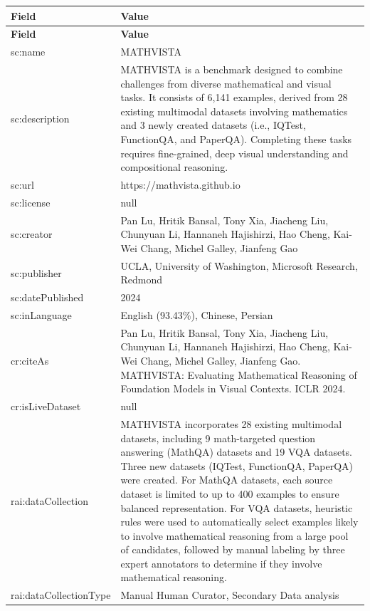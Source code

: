 \documentclass[10pt,a4paper]{article}
\begin{document}
\begin{longtable}{|p{4cm}|p{12cm}|}
\hline
\textbf{Field} & \textbf{Value} \\
\hline
\endfirsthead
\hline
\textbf{Field} & \textbf{Value} \\
\hline
\endhead
\hline
\endfoot

sc:name & MATHVISTA \\
\hline
sc:description & MATHVISTA is a benchmark designed to combine challenges from diverse mathematical and visual tasks. It consists of 6,141 examples, derived from 28 existing multimodal datasets involving mathematics and 3 newly created datasets (i.e., IQTest, FunctionQA, and PaperQA). Completing these tasks requires fine-grained, deep visual understanding and compositional reasoning. \\
\hline
sc:url & https://mathvista.github.io \\
\hline
sc:license & null \\
\hline
sc:creator & Pan Lu, Hritik Bansal, Tony Xia, Jiacheng Liu, Chunyuan Li, Hannaneh Hajishirzi, Hao Cheng, Kai-Wei Chang, Michel Galley, Jianfeng Gao \\
\hline
sc:publisher & UCLA, University of Washington, Microsoft Research, Redmond \\
\hline
sc:datePublished & 2024 \\
\hline
sc:inLanguage & English (93.43\%), Chinese, Persian \\
\hline
cr:citeAs & Pan Lu, Hritik Bansal, Tony Xia, Jiacheng Liu, Chunyuan Li, Hannaneh Hajishirzi, Hao Cheng, Kai-Wei Chang, Michel Galley, Jianfeng Gao. MATHVISTA: Evaluating Mathematical Reasoning of Foundation Models in Visual Contexts. ICLR 2024. \\
\hline
cr:isLiveDataset & null \\
\hline
rai:dataCollection & MATHVISTA incorporates 28 existing multimodal datasets, including 9 math-targeted question answering (MathQA) datasets and 19 VQA datasets. Three new datasets (IQTest, FunctionQA, PaperQA) were created. For MathQA datasets, each source dataset is limited to up to 400 examples to ensure balanced representation. For VQA datasets, heuristic rules were used to automatically select examples likely to involve mathematical reasoning from a large pool of candidates, followed by manual labeling by three expert annotators to determine if they involve mathematical reasoning. \\
\hline
rai:dataCollectionType & Manual Human Curator, Secondary Data analysis \\

\end{longtable}
\end{document}
